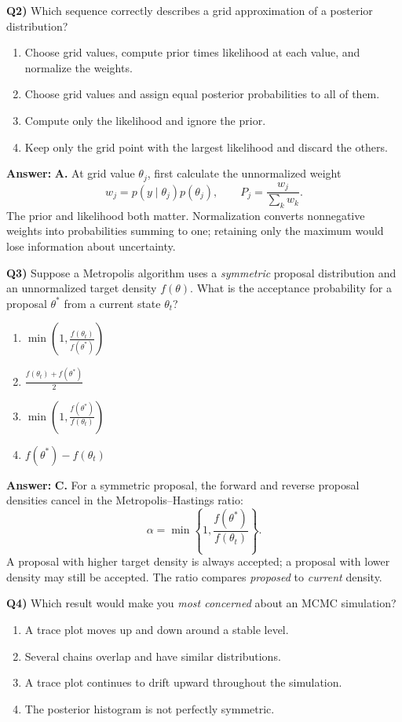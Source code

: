\documentclass[12pt]{article}
\newenvironment{solution}{\par\smallskip\begingroup\color{blue}\noindent\textbf{Answer: }\smallskip}{\par\endgroup\medskip}
\newcommand{\question}[2]{\vspace{0.7em}\noindent\textbf{Q#1)}}
\begin{document}
\question{2}{}
Which sequence correctly describes a grid approximation of a posterior distribution?
\begin{enumerate}[label=\Alph*.,nosep]
\item Choose grid values, compute prior times likelihood at each value, and normalize the weights.
\item Choose grid values and assign equal posterior probabilities to all of them.
\item Compute only the likelihood and ignore the prior.
\item Keep only the grid point with the largest likelihood and discard the others.
\end{enumerate}

\begin{solution}
\textbf{A.} At grid value $\theta_j$, first calculate the unnormalized weight
\[w_j=p(y\mid\theta_j)p(\theta_j),\qquad P_j=\frac{w_j}{\sum_k w_k}.\]
The prior and likelihood both matter. Normalization converts nonnegative weights into probabilities summing to one; retaining only the maximum would lose information about uncertainty.
\end{solution}

\question{3}{}
Suppose a Metropolis algorithm uses a \emph{symmetric} proposal distribution and an unnormalized target density $f(\theta)$. What is the acceptance probability for a proposal $\theta^*$ from a current state $\theta_t$?
\begin{enumerate}[label=\Alph*.,nosep]
\item $\displaystyle \min\!\left(1,\frac{f(\theta_t)}{f(\theta^*)}\right)$
\item $\displaystyle \frac{f(\theta_t)+f(\theta^*)}{2}$
\item $\displaystyle \min\!\left(1,\frac{f(\theta^*)}{f(\theta_t)}\right)$
\item $\displaystyle f(\theta^*)-f(\theta_t)$
\end{enumerate}

\begin{solution}
\textbf{C.} For a symmetric proposal, the forward and reverse proposal densities cancel in the Metropolis--Hastings ratio:
\[\alpha=\min\!\left\{1,\frac{f(\theta^*)}{f(\theta_t)}\right\}.\]
A proposal with higher target density is always accepted; a proposal with lower density may still be accepted. The ratio compares \emph{proposed} to \emph{current} density.
\end{solution}

\question{4}{}
Which result would make you \emph{most concerned} about an MCMC simulation?
\begin{enumerate}[label=\Alph*.,nosep]
\item A trace plot moves up and down around a stable level.
\item Several chains overlap and have similar distributions.
\item A trace plot continues to drift upward throughout the simulation.
\item The posterior histogram is not perfectly symmetric.
\end{enumerate}
\end{document}
